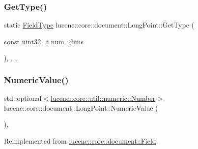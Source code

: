 \subsubsection{\texorpdfstring{Get\+Type()}{GetType()}}
{\footnotesize\ttfamily static \mbox{\hyperlink{classlucene_1_1core_1_1document_1_1FieldType}{Field\+Type}} lucene\+::core\+::document\+::\+Long\+Point\+::\+Get\+Type (\begin{DoxyParamCaption}\item[{\mbox{\hyperlink{ZlibCrc32_8h_a2c212835823e3c54a8ab6d95c652660e}{const}} uint32\+\_\+t}]{num\+\_\+dims }\end{DoxyParamCaption})\hspace{0.3cm}{\ttfamily [inline]}, {\ttfamily [static]}, {\ttfamily [private]}, {\ttfamily [noexcept]}}

\mbox{\label{classlucene_1_1core_1_1document_1_1LongPoint_a24068a492dbb14946de8de3bde3bd87b}} 
\subsubsection{\texorpdfstring{Numeric\+Value()}{NumericValue()}}
{\footnotesize\ttfamily std\+::optional$<$\mbox{\hyperlink{classlucene_1_1core_1_1util_1_1numeric_1_1Number}{lucene\+::core\+::util\+::numeric\+::\+Number}}$>$ lucene\+::core\+::document\+::\+Long\+Point\+::\+Numeric\+Value (\begin{DoxyParamCaption}{ }\end{DoxyParamCaption})\hspace{0.3cm}{\ttfamily [inline]}, {\ttfamily [virtual]}}



Reimplemented from \mbox{\hyperlink{classlucene_1_1core_1_1document_1_1Field_a858814043215c98bacf6ecc823d078ea}{lucene\+::core\+::document\+::\+Field}}.

\mbox{\label{classlucene_1_1core_1_1document_1_1LongPoint_ae106b6585f35417b63c6f1f3aaeb1b93}} 
